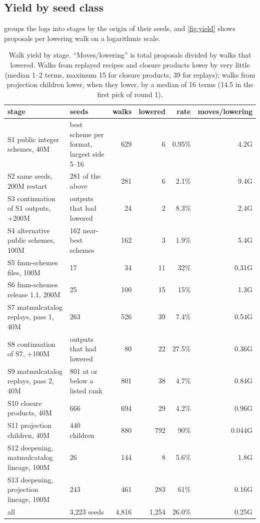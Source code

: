 \subsection{Yield by seed class}
 groups the logs into stages by the origin of their seeds, and \cref{fig:yield} shows proposals per lowering walk on a logarithmic scale.
\begin{table}[t]
\centering\small
\begin{tabular}{@{}p{4.6cm}p{4.1cm}rrrr@{}}
\toprule
stage & seeds & walks & lowered & rate & moves/lowering\\
\midrule
S1 public integer schemes, 40M & best scheme per format, largest side 5--16 & 629 & 6 & 0.95\% & 4.2G\\
S2 same seeds, 200M restart & 281 of the above & 281 & 6 & 2.1\% & 9.4G\\
S3 continuation of S1 outputs, +200M & outputs that had lowered & 24 & 2 & 8.3\% & 2.4G\\
S4 alternative public schemes, 100M & 162 near-best schemes & 162 & 3 & 1.9\% & 5.4G\\
S5 fmm-schemes files, 100M & 17 & 34 & 11 & 32\% & 0.31G\\
S6 fmm-schemes release 1.1, 200M & 25 & 100 & 15 & 15\% & 1.3G\\
S7 matmulcatalog replays, pass 1, 40M & 263 & 526 & 39 & 7.4\% & 0.54G\\
S8 continuation of S7, +100M & outputs that had lowered & 80 & 22 & 27.5\% & 0.36G\\
S9 matmulcatalog replays, pass 2, 40M & 801 at or below a listed rank & 801 & 38 & 4.7\% & 0.84G\\
S10 closure products, 40M & 666 & 694 & 29 & 4.2\% & 0.96G\\
S11 projection children, 40M & 440 children & 880 & 792 & 90\% & 0.044G\\
S12 deepening, matmulcatalog lineage, 100M & 26 & 144 & 8 & 5.6\% & 1.8G\\
S13 deepening, projection lineage, 100M & 243 & 461 & 283 & 61\% & 0.16G\\
\midrule
all & 3{,}223 seeds & 4{,}816 & 1{,}254 & 26.0\% & 0.25G\\
\bottomrule
\end{tabular}
\caption{Walk yield by stage. ``Moves/lowering'' is total proposals divided by walks that lowered. Walks from replayed recipes and closure products lower by very little (median 1--2 terms, maximum 15 for closure products, 39 for replays); walks from projection children lower, when they lower, by a median of 16 terms (14.5 in the first pick of round 1).}
\label{tab:stages}
\end{table}

